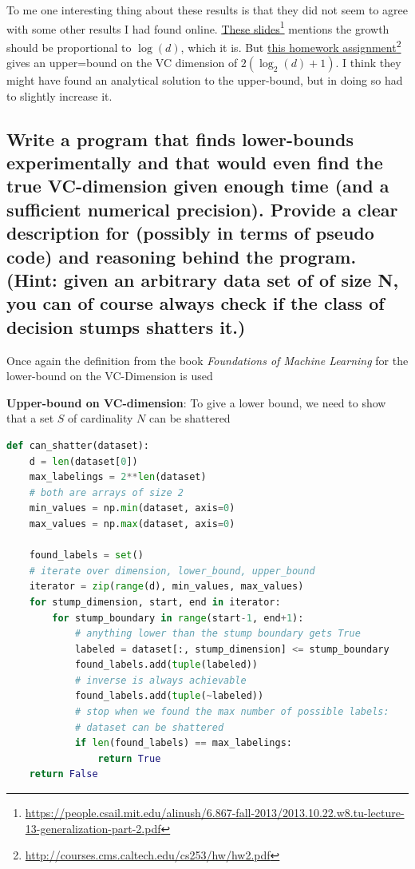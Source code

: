 \documentclass[11pt,a4paper]{article}
\begin{document}
To me one interesting thing about these results is that they did not seem to agree with some other results I had found online. \href{https://people.csail.mit.edu/alinush/6.867-fall-2013/2013.10.22.w8.tu-lecture-13-generalization-part-2.pdf}{\underline{These slides}}\footnote{\url{https://people.csail.mit.edu/alinush/6.867-fall-2013/2013.10.22.w8.tu-lecture-13-generalization-part-2.pdf}} mentions the growth should be proportional to $\log(d)$, which it is. But \href{http://courses.cms.caltech.edu/cs253/hw/hw2.pdf}{\underline{this homework assignment}}\footnote{\url{http://courses.cms.caltech.edu/cs253/hw/hw2.pdf}} gives an upper=bound on the VC dimension of $2(\log_2(d) + 1)$. I think they might have found an analytical solution to the upper-bound, but in doing so had to slightly increase it.

\subsection{Write a program that finds lower-bounds experimentally and that would even find the true VC-dimension given enough time (and a sufficient numerical precision). Provide a clear description for (possibly in terms of pseudo code) and reasoning behind the program. (Hint: given an arbitrary data set of of size N, you can of course always check if the class of decision stumps shatters it.)}
\label{sec:2f}

Once again the definition from the book \textit{Foundations of Machine Learning} \cite{foundations_of_machine_learning} for the lower-bound on the VC-Dimension is used

\textbf{Upper-bound on VC-dimension}: To give a lower bound, we need to show that a set $S$ of cardinality $N$ can be shattered

\begin{lstlisting}[language=Python, caption=Can Shatter Method, label={alg:shatter}]
def can_shatter(dataset):
    d = len(dataset[0])
    max_labelings = 2**len(dataset)
    # both are arrays of size 2
    min_values = np.min(dataset, axis=0)
    max_values = np.max(dataset, axis=0)

    found_labels = set()
    # iterate over dimension, lower_bound, upper_bound
    iterator = zip(range(d), min_values, max_values)
    for stump_dimension, start, end in iterator:
        for stump_boundary in range(start-1, end+1):
            # anything lower than the stump boundary gets True
            labeled = dataset[:, stump_dimension] <= stump_boundary
            found_labels.add(tuple(labeled))
            # inverse is always achievable
            found_labels.add(tuple(~labeled))
            # stop when we found the max number of possible labels:
            # dataset can be shattered
            if len(found_labels) == max_labelings:
                return True
    return False
\end{lstlisting}
\end{document}
